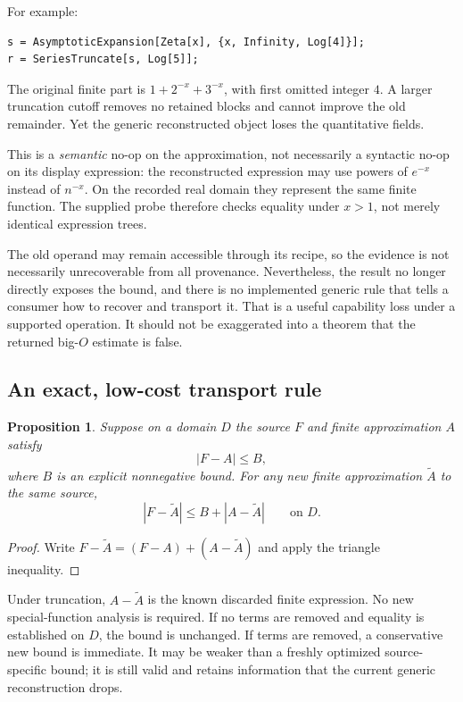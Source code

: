 \documentclass[11pt,a4paper]{article}
\newtheorem{proposition}{Proposition}[section]
\newcommand{\code}[1]{\texttt{\detokenize{#1}}}
\begin{document}
For example:
\begin{lstlisting}
s = AsymptoticExpansion[Zeta[x], {x, Infinity, Log[4]}];
r = SeriesTruncate[s, Log[5]];
\end{lstlisting}
The original finite part is $1+2^{-x}+3^{-x}$, with first omitted integer $4$. A larger truncation cutoff removes no retained blocks and cannot improve the old remainder. Yet the generic reconstructed object loses the quantitative fields.

This is a \emph{semantic} no-op on the approximation, not necessarily a syntactic \code{SameQ} no-op on its display expression: the reconstructed expression may use powers of $e^{-x}$ instead of $n^{-x}$. On the recorded real domain they represent the same finite function. The supplied probe therefore checks equality under $x>1$, not merely identical expression trees.

The old operand may remain accessible through its recipe, so the evidence is not necessarily unrecoverable from all provenance. Nevertheless, the result no longer directly exposes the bound, and there is no implemented generic rule that tells a consumer how to recover and transport it. That is a useful capability loss under a supported operation. It should not be exaggerated into a theorem that the returned big-$O$ estimate is false.

\subsection{An exact, low-cost transport rule}

\begin{proposition}\label{prop:bound-transport}
Suppose on a domain $D$ the source $F$ and finite approximation $A$ satisfy
\[
 |F-A|\le B,
\]
where $B$ is an explicit nonnegative bound. For any new finite approximation $\widetilde A$ to the same source,
\begin{equation}\label{eq:transport}
 |F-\widetilde A|\le B+|A-\widetilde A|\qquad\text{on }D.
\end{equation}
\end{proposition}
\begin{proof}
Write $F-\widetilde A=(F-A)+(A-\widetilde A)$ and apply the triangle inequality.\end{proof}

Under truncation, $A-\widetilde A$ is the known discarded finite expression. No new special-function analysis is required. If no terms are removed and equality is established on $D$, the bound is unchanged. If terms are removed, a conservative new bound is immediate. It may be weaker than a freshly optimized source-specific bound; it is still valid and retains information that the current generic reconstruction drops.
\end{document}

